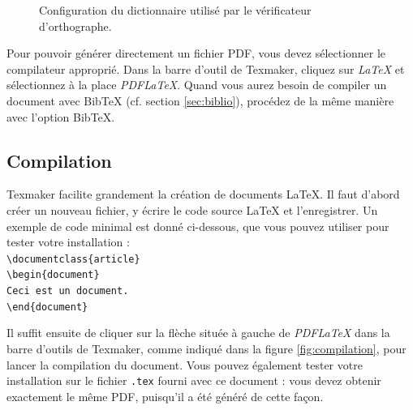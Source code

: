 \documentclass{ceri}
\begin{document}
\begin{figure}[htb]
	\centering
	\caption{Configuration du dictionnaire utilisé par le vérificateur d'orthographe.}
	\label{fig:dictionnaire}
\end{figure}

Pour pouvoir générer directement un fichier PDF, vous devez sélectionner le compilateur approprié. Dans la barre d'outil de Texmaker, cliquez sur \textit{LaTeX} et sélectionnez à la place \textit{PDFLaTeX}. Quand vous aurez besoin de compiler un document avec BibTeX (cf. section \ref{sec:biblio}), procédez de la même manière avec l'option BibTeX.

\subsection{Compilation}
Texmaker facilite grandement la création de documents \LaTeX{}. Il faut d'abord créer un nouveau fichier, y écrire le code source \LaTeX{} et l'enregistrer. Un exemple de code minimal est donné ci-dessous, que vous pouvez utiliser pour tester votre installation :
\vspace{0.3cm}\\
\noindent{}\texttt{\textbackslash{}documentclass\{article\}}\\
\noindent{}\texttt{\textbackslash{}begin\{document\}}\\
\indent{}\texttt{Ceci est un document.}\\
\noindent{}\texttt{\textbackslash{}end\{document\}}
\vspace{0.3cm}

Il suffit ensuite de cliquer sur la flèche située à gauche de \textit{PDFLaTeX} dans la barre d'outils de Texmaker, comme indiqué dans la figure \ref{fig:compilation}, pour lancer la compilation du document. Vous pouvez également tester votre installation sur le fichier \texttt{.tex} fourni avec ce document : vous devez obtenir exactement le même PDF, puisqu'il a été généré de cette façon.
\end{document}
